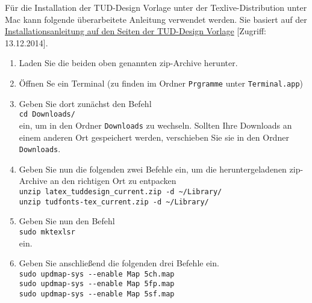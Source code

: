 Für die Installation der TUD-Design Vorlage unter der Texlive-Distribution unter Mac kann folgende überarbeitete Anleitung verwendet werden. Sie basiert auf der \href{http://exp1.fkp.physik.tu-darmstadt.de/tuddesign/Win7_miktex29.html}{Installationsanleitung auf den Seiten der TUD-Design Vorlage} [Zugriff: 13.12.2014].

\begin{enumerate}
	\item Laden Sie die beiden oben genannten zip-Archive herunter.
	\item Öffnen Se ein Terminal (zu finden im Ordner \verb|Prgramme| unter \verb|Terminal.app|)
	\item Geben Sie dort zunächst den Befehl\\
		\verb|cd Downloads/|\\
		ein, um in den Ordner \verb|Downloads| zu wechseln. Sollten Ihre Downloads an einem anderen Ort gespeichert werden, verschieben Sie sie in den Ordner \verb|Downloads|.
	\item Geben Sie nun die folgenden zwei Befehle ein, um die heruntergeladenen zip-Archive an den richtigen Ort zu entpacken\\
		\verb|unzip latex_tuddesign_current.zip -d ~/Library/|\\
		\verb|unzip tudfonts-tex_current.zip -d ~/Library/|
	\item Geben Sie nun den Befehl\\
		\verb|sudo mktexlsr|\\
		ein.
	\item Geben Sie anschließend die folgenden drei Befehle ein.\\
		\verb|sudo updmap-sys --enable Map 5ch.map|\\
		\verb|sudo updmap-sys --enable Map 5fp.map|\\
		\verb|sudo updmap-sys --enable Map 5sf.map|
\end{enumerate}